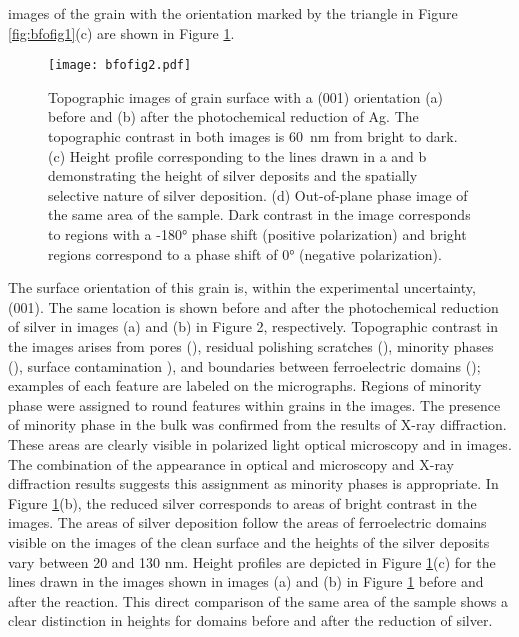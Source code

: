  images of the grain with the orientation marked by the triangle in Figure \ref{fig:bfofig1}(c) are shown in Figure \ref{fig:bfofig2}.
\begin{figure}
	\texttt{[image: bfofig2.pdf]}
	\caption[Topographic  images of  grain surface]{%
		Topographic  images of  grain surface 
		with a (001) orientation (a) before and (b) after the 
		photochemical reduction of Ag. The topographic contrast 
		in both images is \SI{60}{\nano\meter} from bright to 
		dark. (c) Height profile corresponding to the lines drawn 
		in a and b demonstrating the height of silver deposits 
		and the spatially selective nature of silver deposition. 
		(d) Out-of-plane  phase image of the same area of the 
		sample. Dark contrast in the image corresponds to regions 
		with a -180\si{\degree} phase shift (positive polarization) 
		and bright regions correspond to a phase shift of 0\si{\degree} 
		(negative polarization).}
	\label{fig:bfofig2}
\end{figure}
The surface orientation of this grain is, within the experimental uncertainty, (001). The same location is shown before and after the photochemical reduction of silver in images (a) and (b) in Figure 2, respectively. Topographic contrast in the  images arises from pores (), residual polishing scratches (), minority phases (), surface contamination ), and boundaries between ferroelectric domains ();\cite{Catalan:2009ca} examples of each feature are labeled on the micrographs. \label{minorityphase}Regions of minority phase were assigned to round features within grains in the  images. The presence of minority phase in the bulk was confirmed from the results of X-ray diffraction. These areas are clearly visible in polarized light optical microscopy and in  images. The combination of the appearance in optical and  microscopy and X-ray diffraction results suggests this assignment as minority phases is appropriate. In Figure \ref{fig:bfofig2}(b), the reduced silver corresponds to areas of bright contrast in the  images. The areas of silver deposition follow the areas of ferroelectric domains visible on the images of the clean surface and the heights of the silver deposits vary between 20 and 130 nm. Height profiles are depicted in Figure \ref{fig:bfofig2}(c) for the lines drawn in the  images shown in images (a) and (b) in Figure \ref{fig:bfofig2} before and after the reaction. This direct comparison of the same area of the sample shows a clear distinction in heights for domains before and after the reduction of silver.

